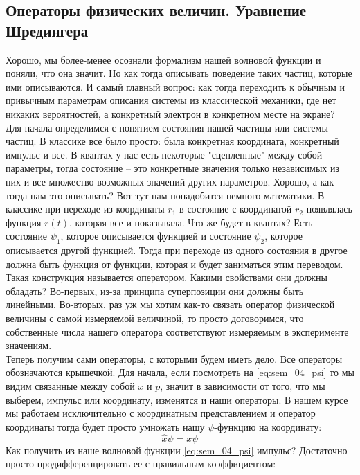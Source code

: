 \documentclass[12pt]{article}
\begin{document}
\subsection{Операторы физических величин. Уравнение Шредингера}
Хорошо, мы более-менее осознали формализм нашей волновой функции и поняли, что она значит. Но как тогда описывать поведение таких частиц, которые ими описываются. И самый главный вопрос: как тогда переходить к обычным и привычным параметрам описания системы из классической механики, где нет никаких вероятностей, а конкретный электрон в конкретном месте на экране? \\
Для начала определимся с понятием состояния нашей частицы или системы частиц. В классике все было просто: была конкретная координата, конкретный импульс и все. В квантах у нас есть некоторые "сцепленные" между собой параметры, тогда состояние -- это конкретные значения только независимых из них и все множество возможных значений других параметров. Хорошо, а как тогда нам это описывать?  Вот тут нам понадобится немного математики. В классике при переходе из координаты $r_1$ в состояние с координатой $r_2$ появлялась функция $r(t)$, которая все и показывала. Что же будет в квантах? Есть состояние $\psi_1$, которое описывается функцией и состояние $\psi_2$, которое описывается другой функцией. Тогда при переходе из одного состояния в другое должна быть функция от функции, которая и будет заниматься этим переводом. Такая конструкция называется оператором. Какими свойствами они должны обладать? Во-первых, из-за принципа суперпозиции они должны быть линейными. Во-вторых, раз уж мы хотим как-то связать оператор физической величины с самой измеряемой величиной, то просто договоримся, что собственные числа нашего оператора соответствуют измеряемым в эксперименте значениям.\\
Теперь получим сами операторы, с которыми будем иметь дело. Все операторы обозначаются крышечкой. Для начала, если посмотреть на \ref{eq:sem_04_psi} то мы видим связанные между собой $x$ и $p$, значит в зависимости от того, что мы выберем, импульс или координату, изменятся и наши операторы. В нашем курсе мы работаем исключительно с координатным представлением и оператор координаты тогда будет просто умножать нашу $\psi$-функцию на координату:
\begin{equation}
\label{eq:sem_04_coordinate}
    \hat{x}\psi = x\psi
\end{equation}
Как получить из наше волновой функции \ref{eq:sem_04_psi} импульс? Достаточно просто продифференцировать ее с правильным коэффициентом:
\end{document}
